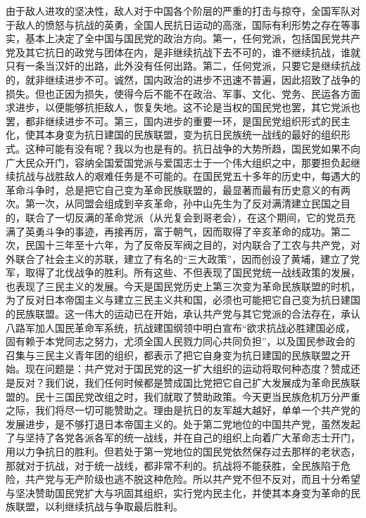 由于敌人进攻的坚决性，敌人对于中国各个阶层的严重的打击与掠夺，全国军队对于敌人的愤怒与抗战的英勇，全国人民抗日运动的高涨，国际有利形势之存在等事实，基本上决定了全中国与国民党的政治方向。第一，任何党派，包括国民党共产党及其它抗日的政党与团体在内，是非继续抗战下去不可的，谁不继续抗战，谁就只有一条当汉奸的出路，此外没有任何出路。第二，任何党派，只要它是继续抗战的，就非继续进步不可。诚然，国内政治的进步不迅速不普遍，因此招致了战争的损失。但也正因为损失，使得今后不能不在政治、军事、文化、党务、民运各方面求进步，以便能够抗拒敌人，恢复失地。这不论是当权的国民党也罢，其它党派也罢，都非继续进步不可。第三，国内进步的重要一环，是国民党组织形式的民主化，使其本身变为抗日建国的民族联盟，变为抗日民族统一战线的最好的组织形式。这种可能有没有呢？我以为也是有的。抗日战争的大势所趋，国民党如果不向广大民众开门，容纳全国爱国党派与爱国志士于一个伟大组织之中，那要担负起继续抗战与战胜敌人的艰难任务是不可能的。在国民党五十多年的历史中，每遇大的革命斗争时，总是把它自己变为革命民族联盟的，最显著而最有历史意义的有两次。第一次，从同盟会组成到辛亥革命，孙中山先生为了反对满清建立民国之目的，联合了一切反满的革命党派（从光复会到哥老会），在这个期间，它的党员充满了英勇斗争的事迹，再接再厉，富于朝气，因而取得了辛亥革命的成功。第二次，民国十三年至十六年，为了反帝反军阀之目的，对内联合了工农与共产党，对外联合了社会主义的苏联，建立了有名的“三大政策”，因而创设了黄埔，建立了党军，取得了北伐战争的胜利。所有这些、不但表现了国民党统一战线政策的发展，也表现了三民主义的发展。今天是国民党历史上第三次变为革命民族联盟的时机，为了反对日本帝国主义与建立三民主义共和国，必须也可能把它自己变为抗日建国的民族联盟。这一伟大的运动已在开始，承认共产党与其它党派的合法存在，承认八路军加人国民革命军系统，抗战建国纲领中明白宣布“欲求抗战必胜建国必成，固有赖于本党同志之努力，尤须全国人民戮力同心共同负担”，以及国民参政会的召集与三民主义青年团的组织，都表示了把它自身变为抗日建国的民族联盟之开始。现在问题是：共产党对于国民党的这一扩大组织的运动将取何种态度？赞成还是反对？我们说，我们任何时候都是赞成国比党把它自己扩大发展成为革命民族联盟的。民十三国民党改组之时，我们就取了赞助政策。今天更当民族危机万分严重之际，我们将尽一切可能赞助之。理由是抗日的友军越大越好，单单一个共产党的发展进步，是不够打退日本帝国主义的。处于第二党地位的中国共产党，虽然发起了与坚持了各党各派各军的统一战线，并在自己的组织上向着广大革命志士开门，用以力争抗日的胜利。但若处于第一党地位的国民党依然保存过去那样的老状态，那就对于抗战，对于统一战线，都非常不利的。抗战将不能获胜，全民族陷于危险，共产党与无产阶级也逃不脱这种危险。所以共产党不但不反对，而且十分希望与坚决赞助国民党扩大与巩固其组织，实行党内民主化，并使其本身变为革命的民族联盟，以利继续抗战与争取最后胜利。

